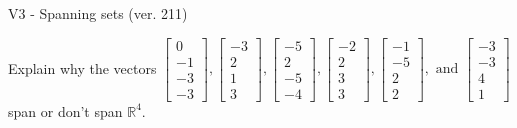\begin{exercise}
  \begin{exerciseTitle}V3 - Spanning sets (ver. 211)\end{exerciseTitle}
  \begin{exerciseStatement}
    Explain why the vectors \(\left[\begin{array}{r}
0 \\
-1 \\
-3 \\
-3
\end{array}\right] , \left[\begin{array}{r}
-3 \\
2 \\
1 \\
3
\end{array}\right] , \left[\begin{array}{r}
-5 \\
2 \\
-5 \\
-4
\end{array}\right] , \left[\begin{array}{r}
-2 \\
2 \\
3 \\
3
\end{array}\right] , \left[\begin{array}{r}
-1 \\
-5 \\
2 \\
2
\end{array}\right] , \text{ and } \left[\begin{array}{r}
-3 \\
-3 \\
4 \\
1
\end{array}\right]\) span or don't span \(\mathbb{R}^4\). 
	



\end{exerciseStatement}
\end{exercise}
